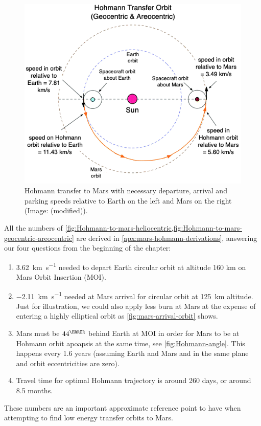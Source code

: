 \begin{figure}[ht]
    \centering
    \includegraphics[width=0.7\linewidth]{fig/Hohmann-to-mars-geocentric-areocentric.png}
    \caption{Hohmann transfer to Mars with necessary departure, arrival and parking speeds relative to Earth on the left and Mars on the right (Image: \cite[p.~133]{Rapp2016} (modified)).}
    \label{fig:Hohmann-to-mars-geocentric-areocentric}
\end{figure}

All the numbers of \cref{fig:Hohmann-to-mars-heliocentric,fig:Hohmann-to-mars-geocentric-areocentric} are derived in \cref{apx:mars-hohmann-derivations}, answering our four questions from the beginning of the chapter:

\begin{enumerate}
	\item \SI{3.62}{\km\per\s} needed to depart Earth circular orbit at altitude 160 km on Mars Orbit Insertion (MOI).
	\item \SI{-2.11}{\km\per\s} needed at Mars arrival for circular orbit at \SI{125}{\km} altitude. Just for illustration, we could also apply less burn at Mars at the expense of entering a highly elliptical orbit as \cref{fig:mars-arrival-orbit} shows.
	\item Mars must be $44^\degree$ behind Earth at MOI in order for Mars to be at Hohmann orbit apoapsis at the same time, see \cref{fig:Hohmann-angle}. This happens every 1.6 years \cite{Odenwald} (assuming Earth and Mars and in the same plane and orbit eccentricities are zero).
	\item Travel time for optimal Hohmann trajectory is around 260 days, or around 8.5 months.
\end{enumerate}

These numbers are an important approximate reference point to have when attempting to find low energy transfer orbits to Mars.

